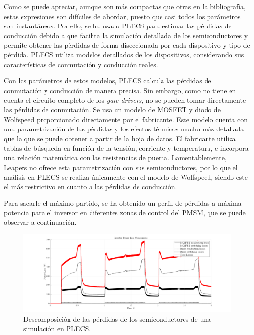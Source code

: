 Como se puede apreciar, aunque son más compactas que otras en la bibliografía, estas expresiones son difíciles de abordar, puesto que casi todos los parámetros son instantáneos. Por ello, se ha usado PLECS para estimar las pérdidas de conducción debido a que facilita la simulación detallada de los semiconductores y permite obtener las pérdidas de forma diseccionada por cada dispositivo y tipo de pérdida. PLECS utiliza modelos detallados de los dispositivos, considerando sus características de conmutación y conducción reales.

Con los parámetros de estos modelos, PLECS calcula las pérdidas de conmutación y conducción de manera precisa. Sin embargo, como no tiene en cuenta el circuito completo de los \textit{gate drivers}, no se pueden tomar directamente las pérdidas de conmutación. Se usa un modelo de MOSFET y diodo de Wolfspeed proporcionado directamente por el fabricante. Este modelo cuenta con una parametrización de las pérdidas y los efectos térmicos mucho más detallada que la que se puede obtener a partir de la hoja de datos. El fabricante utiliza tablas de búsqueda en función de la tensión, corriente y temperatura, e incorpora una relación matemática con las resistencias de puerta. Lamentablemente, Leapers no ofrece esta parametrización con sus semiconductores, por lo que el análisis en PLECS se realiza únicamente con el modelo de Wolfspeed, siendo este el más restrictivo en cuanto a las pérdidas de conducción.

Para sacarle el máximo partido, se ha obtenido un perfil de pérdidas a máxima potencia para el inversor en diferentes zonas de control del PMSM, que se puede observar a continuación.

\begin{figure}[H]
	\centering
	\includegraphics[width=0.9\linewidth]{fig/PLECS-invLosses}
	\caption{Descomposición de las pérdidas de los semiconductores de una simulación en PLECS.}
	\label{losses-sim}
\end{figure}

